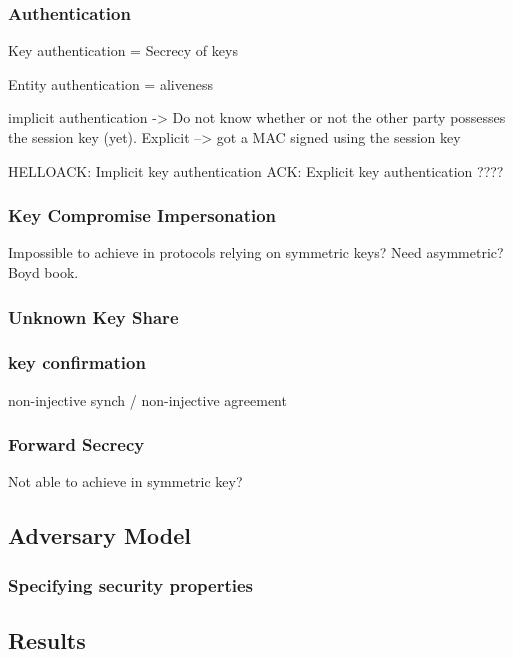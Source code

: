 \subsubsection{Authentication}

Key authentication = Secrecy of keys

Entity authentication = aliveness


implicit authentication -> Do not know whether or not the other party possesses the session key (yet). Explicit --> got a MAC signed using the session key


HELLOACK: Implicit key authentication
ACK: Explicit key authentication ????

\subsubsection{Key Compromise Impersonation}

Impossible to achieve in protocols relying on symmetric keys? Need asymmetric? Boyd book.

\subsubsection{Unknown Key Share}

\subsubsection{key confirmation}

non-injective synch / non-injective agreement

\subsubsection{Forward Secrecy}

Not able to achieve in symmetric key?


\subsection{Adversary Model}

\subsubsection{Specifying security properties}

\subsection{Results}

